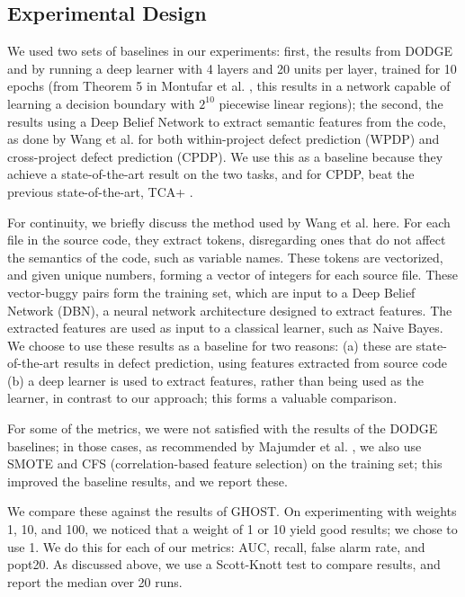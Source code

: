\documentclass[10pt,compsoc,twocolumn]{IEEEtran}
\begin{document}
\subsection{Experimental Design}

We used two sets of baselines in our experiments: first, the results from DODGE \cite{agrawal2019dodge} and by running a deep learner with 4 layers and 20 units per layer, trained for 10 epochs (from Theorem 5 in Montufar et al. \cite{montufar2014number}, this results in a network capable of learning a decision boundary with $2^{10}$ piecewise linear regions); the second, the results using a Deep Belief Network to extract semantic features from the code, as done by Wang et al. \cite{wang2016automatically} for both within-project defect prediction (WPDP) and cross-project defect prediction (CPDP). We use this as a baseline because they achieve a state-of-the-art result on the two tasks, and for CPDP, beat the previous state-of-the-art, TCA+ \cite{liu2019two}.

For continuity, we briefly discuss the method used by Wang et al.\cite{wang2016automatically} here. For each file in the source code, they extract tokens, disregarding ones that do not affect the semantics of the code, such as variable names. These tokens are vectorized, and given unique numbers, forming a vector of integers for each source file. These vector-buggy pairs form the training set, which are input to a Deep Belief Network (DBN), a neural network architecture designed to extract features. The extracted features are used as input to a classical learner, such as Naive Bayes. We choose to use these results as a baseline for two reasons: (a) these are state-of-the-art results in defect prediction, using features extracted from source code (b) a deep learner is used to extract features, rather than being used as the learner, in contrast to our approach; this forms a valuable comparison.

For some of the metrics, we were not satisfied with the results of the DODGE baselines; in those cases, as recommended by Majumder et al. \cite{majumder2019learning}, we also use SMOTE and CFS (correlation-based feature selection) on the training set; this improved the baseline results, and we report these.

We compare these against the results of GHOST. On experimenting with weights 1, 10, and 100, we noticed that a weight of 1 or 10 yield good results; we chose to use 1. We do this for each of our metrics: AUC, recall, false alarm rate, and popt20. As discussed above, we use a Scott-Knott test to compare results, and report the median over 20 runs.
\end{document}
